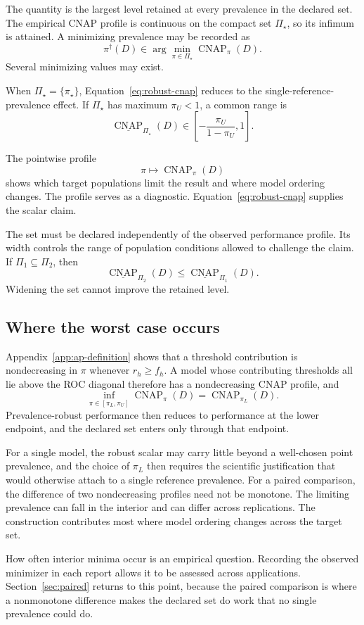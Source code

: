 \documentclass[11pt]{article}
\newcommand{\CNAP}{\operatorname{CNAP}}
\newcommand{\PSet}{\Pi_\star}
\newcommand{\RobCNAP}{\underline{\CNAP}_{\PSet}}
\theoremstyle{remark}
\begin{document}
The quantity is the largest level retained at every prevalence in the declared set. The empirical CNAP profile is continuous on the compact set $\PSet$, so its infimum is attained. A minimizing prevalence may be recorded as
\[
\pi^\dagger(D)
\in
\arg\min_{\pi\in\PSet}\CNAP_\pi(D).
\]
Several minimizing values may exist.

When $\PSet=\{\pi_\star\}$, Equation~\eqref{eq:robust-cnap} reduces to the single-reference-prevalence effect. If $\PSet$ has maximum $\pi_U<1$, a common range is
\[
\RobCNAP(D)
\in
\left[-\frac{\pi_U}{1-\pi_U},1\right].
\]

The pointwise profile
\[
\pi\longmapsto\CNAP_\pi(D)
\]
shows which target populations limit the result and where model ordering changes. The profile serves as a diagnostic. Equation~\eqref{eq:robust-cnap} supplies the scalar claim.

The set must be declared independently of the observed performance profile. Its width controls the range of population conditions allowed to challenge the claim. If $\Pi_1\subseteq\Pi_2$, then
\[
\underline{\CNAP}_{\Pi_2}(D)
\leq
\underline{\CNAP}_{\Pi_1}(D).
\]
Widening the set cannot improve the retained level.

\subsection{Where the worst case occurs}
\label{sec:worst-case}

Appendix~\ref{app:ap-definition} shows that a threshold contribution is nondecreasing in $\pi$ whenever $r_h\geq f_h$. A model whose contributing thresholds all lie above the ROC diagonal therefore has a nondecreasing CNAP profile, and
\[
\inf_{\pi\in[\pi_L,\pi_U]}\CNAP_\pi(D)
=
\CNAP_{\pi_L}(D).
\]
Prevalence-robust performance then reduces to performance at the lower endpoint, and the declared set enters only through that endpoint.

For a single model, the robust scalar may carry little beyond a well-chosen point prevalence, and the choice of $\pi_L$ then requires the scientific justification that would otherwise attach to a single reference prevalence. For a paired comparison, the difference of two nondecreasing profiles need not be monotone. The limiting prevalence can fall in the interior and can differ across replications. The construction contributes most where model ordering changes across the target set.

How often interior minima occur is an empirical question. Recording the observed minimizer in each report allows it to be assessed across applications. Section~\ref{sec:paired} returns to this point, because the paired comparison is where a nonmonotone difference makes the declared set do work that no single prevalence could do.
\end{document}
